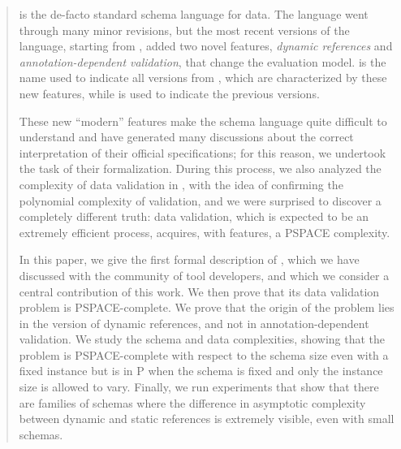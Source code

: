 \begin{abstract}
{\jsonsch}  is the de-facto standard schema language for {\json} data.
The language went through many minor revisions, but the most recent versions of the language, starting from {\DNineteen}, added two novel features,  \emph{dynamic references} and \emph{annotation-dependent validation}, that change the evaluation model. {\emph{\mJS}} is the name used to indicate all versions from {\DNineteen}, which are characterized by these new features, while {\emph{\cJS}} is used to indicate the previous versions.

These new ``modern'' features make the schema language quite difficult to understand and have generated many discussions about the correct interpretation of their official specifications; for this reason, we undertook the task of their formalization.
During this process, we also analyzed the complexity of data validation in {\mJS}, with the idea of confirming the polynomial complexity of {\cJS} validation, and we were surprised to discover a completely different truth: data validation, which is expected to be an extremely efficient process, acquires, with {\mJS} features, a PSPACE complexity.

In this paper, we give the first formal description of {\mJS}, which we have discussed with the community of {\jsonsch} tool developers,
and which we consider a central contribution of this work.
We then prove that its data validation problem is PSPACE-complete.
We prove that the origin of the problem lies in the {\DTwenty} version of dynamic references, and not in annotation-dependent validation. 
We study the schema and data complexities, showing that the problem is PSPACE-complete with respect to the schema size even with a fixed instance
but is in P when the schema is fixed and only the instance size is allowed to vary.
Finally, we run experiments that show that there are families of schemas where the difference in asymptotic complexity between dynamic
and static references is extremely visible, even with small schemas. 

\end{abstract}
